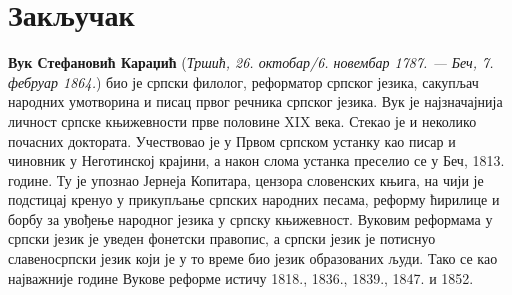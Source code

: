 \documentclass[12pt,oneside]{memoir}
\begin{document}
\chapter{Закључак}

\pangrami

\pangrami

\literatura

\backmatter

\begin{biografija}
\textbf{Вук Стефановић Караџић} (\emph{Тршић, 26. октобар/6. новембар
  1787. — Беч, 7. фебруар 1864.}) био је српски филолог, реформатор
српског језика, сакупљач народних умотворина и писац првог речника
српског језика.  Вук је најзначајнија личност српске књижевности прве
половине XIX века. Стекао је и неколико почасних доктората.
Учествовао је у Првом српском устанку као писар и чиновник у
Неготинској крајини, а након слома устанка преселио се у Беч,
1813. године. Ту је упознао Јернеја Копитара, цензора словенских
књига, на чији је подстицај кренуо у прикупљање српских народних
песама, реформу ћирилице и борбу за увођење народног језика у српску
књижевност. Вуковим реформама у српски језик је уведен фонетски
правопис, а српски језик је потиснуо славеносрпски језик који је у то
време био језик образованих људи. Тако се као најважније године Вукове
реформе истичу 1818., 1836., 1839., 1847. и 1852.
\end{biografija}
\end{document}
